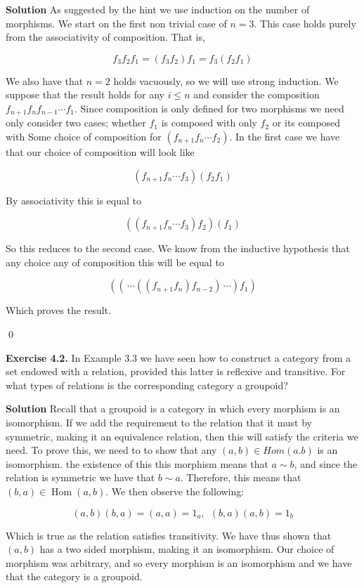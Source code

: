 \documentclass[titlepage]{article}
\newcommand{\Exercise}[1]{\textbf{Exercise #1}}
\newcommand{\Solution}{\textbf{Solution }}
\DeclareMathOperator{\Hom}{Hom}
\begin{document}
\Solution As suggested by the hint we use induction on the number of morphisms. We start on the first non trivial case of $n=3$. This case holds purely from the associativity of composition. That is,

\[ f_3 f_2 f_1 = (f_3 f_2) f_1 = f_3 (f_2 f_1)\]

We also have that $n=2$ holds vacuously, so we will use strong induction. We suppose that the result holds for any $i \leq n$ and consider the composition $f_{n+1} f_n f_{n-1} \dotsi f_1$. Since composition is only defined for two morphisms we need only consider two cases; whether $f_{1}$ is composed with only $f_2$ or its composed with Some choice of composition for $(f_{n+1} f_{n} \dotsi f_2)$. In the first case we have that our choice of composition will look like

\[ (f_{n+1} f_n \dotsi f_3)(f_2 f_1)\]

By associativity this is equal to 

\[ ((f_{n+1} f_n \dotsi f_3) f_2)(f_1)\]

So this reduces to the second case. We know from the inductive hypothesis that any choice any of composition this will be equal to

\[ (( \, \dotsi ((f_{n+1}f_n)f_{n-2})\,\dotsi)f_1)\]

Which proves the result.

\qed

\bigskip

\Exercise{4.2.} In Example 3.3 we have seen how to construct a category from a set endowed with a relation, provided this latter is reflexive and transitive. For what types of relations is the corresponding category a groupoid?

\medskip

\Solution Recall that a groupoid is a category in which every morphism is an isomorphism. If we add the requirement to the relation that it must by symmetric, making it an equivalence relation, then this will satisfy the criteria we need. To prove this, we need to to show that any $(a,b) \in Hom(a.b)$ is an isomorphism. the existence of this this morphism means that $a \sim b$, and since the relation is symmetric we have that $b \sim a$. Therefore, this means that $(b,a) \in \Hom(a,b)$. We then observe the following:

\[ (a,b)(b,a) = (a,a) = 1_a, \ \ (b,a)(a,b) = 1_b \]

Which is true as the relation satisfies transitivity. We have thus shown that $(a,b)$ has a two sided morphism, making it an isomorphism. Our choice of morphism was arbitrary, and so every morphism is an isomorphism and we have that the category is a groupoid.
\end{document}
